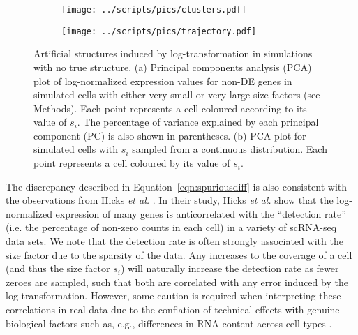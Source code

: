 \documentclass[10pt,letterpaper]{article}
\begin{document}
\begin{figure}[btp]
\centering
\begin{subfigure}[b]{0.49\textwidth}
    \texttt{[image: ../scripts/pics/clusters.pdf]}
    \caption{}
\end{subfigure}
\begin{subfigure}[b]{0.49\textwidth}
    \texttt{[image: ../scripts/pics/trajectory.pdf]}
    \caption{}
\end{subfigure}
\caption{Artificial structures induced by log-transformation in simulations with no true structure.
(a) Principal components analysis (PCA) plot of log-normalized expression values for non-DE genes in simulated cells with either very small or very large size factors (see Methods).
Each point represents a cell coloured according to its value of $s_i$.
The percentage of variance explained by each principal component (PC) is also shown in parentheses. 
(b) PCA plot for simulated cells with $s_i$ sampled from a continuous distribution.
Each point represents a cell coloured by its value of $s_i$.
}
\label{fig:structures}
\end{figure}

The discrepancy described in Equation~\ref{eqn:spuriousdiff} is also consistent with the observations from Hicks \emph{et al.} \cite{hicks2017missing}.
In their study, Hicks \emph{et al.} show that the log-normalized expression of many genes is anticorrelated with the ``detection rate'' (i.e. the percentage of non-zero counts in each cell) in a variety of scRNA-seq data sets.
We note that the detection rate is often strongly associated with the size factor due to the sparsity of the data.
Any increases to the coverage of a cell (and thus the size factor $s_i$) will naturally increase the detection rate as fewer zeroes are sampled,
such that both are correlated with any error induced by the log-transformation.
However, some caution is required when interpreting these correlations in real data due to the conflation of technical effects with genuine biological factors such as, e.g., differences in RNA content across cell types \cite{islam2011characterization,lun2017assessing}.
\end{document}
